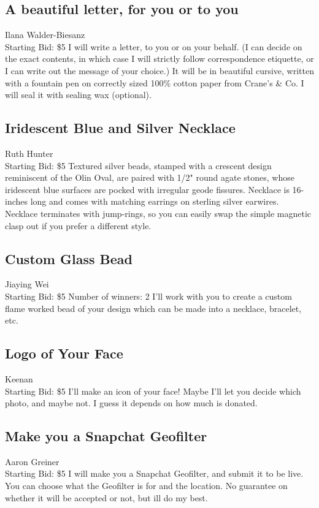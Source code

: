 \documentclass[11pt]{article}
\begin{document}
\subsection{A beautiful letter, for you or to you}
Ilana Walder-Biesanz
\\
Starting Bid: \$5
\newline
I will write a letter, to you or on your behalf. (I can decide on the exact contents, in which case I will strictly follow correspondence etiquette, or I can write out the message of your choice.) It will be in beautiful cursive, written with a fountain pen on correctly sized 100\% cotton paper from Crane's \& Co. I will seal it with sealing wax (optional).
\subsection{Iridescent Blue and Silver Necklace}
Ruth Hunter
\\
Starting Bid: \$5
\newline
Textured silver beads, stamped with a crescent design reminiscent of the Olin Oval, are paired with 1/2" round agate stones, whose iridescent blue surfaces are pocked with irregular geode fissures. Necklace is 16-inches long and comes with matching earrings on sterling silver earwires.  Necklace terminates with jump-rings, so you can easily swap the simple magnetic clasp out if you prefer a different style.
\subsection{Custom Glass Bead}
Jiaying Wei
\\
Starting Bid: \$5
\newline
Number of winners: 2
\newline
I'll work with you to create a custom flame worked bead of your design which can be made into a necklace, bracelet, etc.
\subsection{Logo of Your Face}
Keenan
\\
Starting Bid: \$5
\newline
I'll make an icon of your face! Maybe I'll let you decide which photo, and maybe not. I guess it depends on how much is donated.
\subsection{Make you a Snapchat Geofilter}
Aaron Greiner
\\
Starting Bid: \$5
\newline
I will make you a Snapchat Geofilter, and submit it to be live. You can choose what the Geofilter is for and the location. No guarantee on whether it will be accepted or not, but ill do my best.
\end{document}
